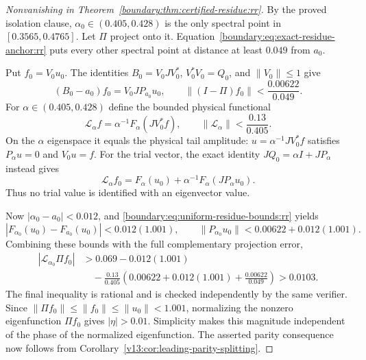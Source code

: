 \begin{proof}[Nonvanishing in Theorem~\ref{boundary:thm:certified-residue:rr}]
By the proved isolation clause, $\alpha_0\in(0.405,0.428)$ is the
only spectral point in $[0.3565,0.4765]$. Let $\Pi$ project onto it.
Equation~\eqref{boundary:eq:exact-residue-anchor:rr} puts every other
spectral point at distance at least $0.049$ from $a_0$.

Put $f_0=V_0u_0$.  The identities
$B_0=V_0JV_0^*$, $V_0^*V_0=Q_0$, and $\|V_0\|\le1$ give
\[
 (B_0-a_0)f_0=V_0JP_{a_0}u_0,\qquad
 \|(I-\Pi)f_0\|<\frac{0.00622}{0.049}.
\]
For $\alpha\in(0.405,0.428)$ define the bounded physical functional
\[
 \mathcal L_\alpha f=\alpha^{-1}F_\alpha(JV_0^*f),\qquad
 \|\mathcal L_\alpha\|<\frac{0.13}{0.405}.
\]
On the $\alpha$ eigenspace it equals the physical tail amplitude:
$u=\alpha^{-1}JV_0^*f$ satisfies $P_\alpha u=0$ and $V_0u=f$.
For the trial vector, the exact identity $JQ_0=\alpha I+JP_\alpha$
instead gives
\[
 \mathcal L_\alpha f_0
    =F_\alpha(u_0)+\alpha^{-1}F_\alpha(JP_\alpha u_0).
\]
Thus no trial value is identified with an eigenvector value.

Now $|\alpha_0-a_0|<0.012$, and
\eqref{boundary:eq:uniform-residue-bounds:rr} yields
\[
 |F_{\alpha_0}(u_0)-F_{a_0}(u_0)|<0.012(1.001),\qquad
 \|P_{\alpha_0}u_0\|<0.00622+0.012(1.001).
\]
Combining these bounds with the full complementary projection error,
\begin{align*}
 |\mathcal L_{\alpha_0}\Pi f_0|
 &>0.069-0.012(1.001)\\
 &\quad-\frac{0.13}{0.405}
       \left(0.00622+0.012(1.001)+\frac{0.00622}{0.049}\right)
 >0.0103.
\end{align*}
The final inequality is rational and is checked independently by the
same verifier.  Since $\|\Pi f_0\|\le\|f_0\|\le\|u_0\|<1.001$,
normalizing the nonzero eigenfunction $\Pi f_0$ gives $|\eta|>0.01$.
Simplicity makes this magnitude independent of the phase of the
normalized eigenfunction.  The asserted parity consequence now
follows from Corollary~\ref{v13:cor:leading-parity-splitting}.
\end{proof}


